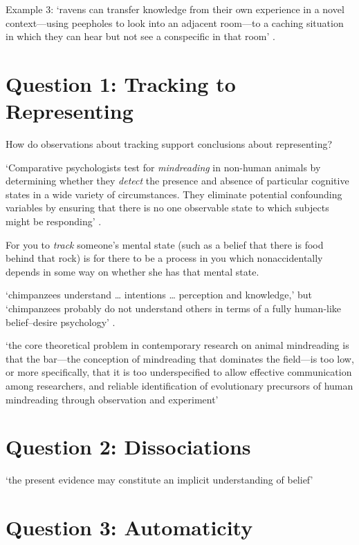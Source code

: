 \documentclass[12pt]{extarticle}
\begin{document}
\begin{multicols*}{3}
Example 3: ‘ravens can transfer knowledge from their own experience in a novel context---using peepholes to look
into an adjacent room---to a caching situation in which they can hear but not see a conspecific in that
room’ \citep{bugnyar:2016_ravens}.

\section{Question 1: Tracking to Representing}

How do observations about tracking support conclusions about representing?

‘Comparative psychologists test for \emph{mindreading} in non-human animals by determining whether they
\emph{detect} the presence and absence of particular cognitive states in a wide variety of
circumstances.
They eliminate potential confounding variables by ensuring that there is no one
observable state to which subjects might be responding’
\citep[p.~487]{halina:2015_there}.

For you to \emph{track} someone’s mental state (such as a belief that there is food behind that rock)
is for there to be a process in you which nonaccidentally depends in some way on whether she has that
mental state.



‘chimpanzees understand … intentions … perception and knowledge,’ but ‘chimpanzees probably do not
understand others in terms of a fully human-like belief–desire psychology’
\citet[p.~191]{Call:2008di}.

‘the core theoretical problem in contemporary research on animal mindreading is that the bar—the
conception of mindreading that dominates the field—is too low, or more specifically, that it is
too underspecified to allow effective communication among researchers, and reliable
identification of evolutionary precursors of human mindreading through observation and experiment’
\citep[p.~318]{heyes:2014_animal}

 
\section{Question 2: Dissociations}
 
‘the present evidence may constitute an implicit understanding of belief’
\citep[p.~113]{krupenye:2016_great}



 
\section{Question 3: Automaticity}


\end{multicols*}
\end{document}
